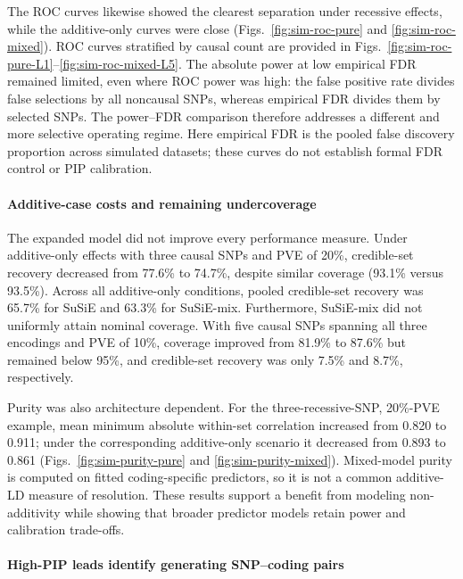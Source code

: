 \documentclass[12pt]{article}
\begin{document}
The ROC curves likewise showed the clearest separation under recessive
effects, while the additive-only curves were close
(Figs.~\ref{fig:sim-roc-pure} and \ref{fig:sim-roc-mixed}).
ROC curves stratified by causal count are provided in
Figs.~\ref{fig:sim-roc-pure-L1}--\ref{fig:sim-roc-mixed-L5}.
The absolute power at low empirical FDR remained limited, even where
ROC power was high: the false positive rate divides false selections
by all noncausal SNPs, whereas empirical FDR divides them by selected
SNPs. The power--FDR comparison therefore addresses a different and
more selective operating regime. Here empirical FDR is the pooled
false discovery proportion across simulated datasets; these curves
do not establish formal FDR control or PIP calibration.

\paragraph{Additive-case costs and remaining undercoverage}

The expanded model did not improve every performance measure. Under
additive-only effects with three causal SNPs and PVE of 20\%,
credible-set recovery decreased from 77.6\% to 74.7\%, despite similar
coverage (93.1\% versus 93.5\%). Across all additive-only conditions,
pooled credible-set recovery was 65.7\% for SuSiE and 63.3\% for
SuSiE-mix. Furthermore, SuSiE-mix did not uniformly attain nominal
coverage. With five causal SNPs spanning all three encodings and PVE
of 10\%, coverage improved from 81.9\% to 87.6\% but remained below
95\%, and credible-set recovery was only 7.5\% and 8.7\%, respectively.

Purity was also architecture dependent. For the three-recessive-SNP,
20\%-PVE example, mean minimum absolute within-set correlation increased
from 0.820 to 0.911; under the corresponding additive-only scenario it
decreased from 0.893 to 0.861 (Figs.~\ref{fig:sim-purity-pure} and
\ref{fig:sim-purity-mixed}). Mixed-model purity is computed on fitted
coding-specific predictors, so it is not a common additive-LD measure
of resolution. These results support a benefit from modeling
non-additivity while showing that broader predictor models retain
power and calibration trade-offs.

\paragraph{High-PIP leads identify generating SNP--coding pairs}
\end{document}
